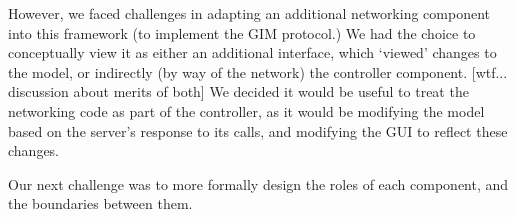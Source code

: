 However, we faced challenges in adapting an additional networking component into this framework (to implement the GIM protocol.) We had the choice to conceptually view it as either an additional interface, which ‘viewed’ changes to the model, or indirectly (by way of the network) the controller component. [wtf... discussion about merits of both] We decided it would be useful to treat the networking code as part of the controller, as it would be modifying the model based on the server’s response to its calls, and modifying the GUI to reflect these changes.
	
Our next challenge was to more formally design the roles of each component, and the boundaries between them. 
